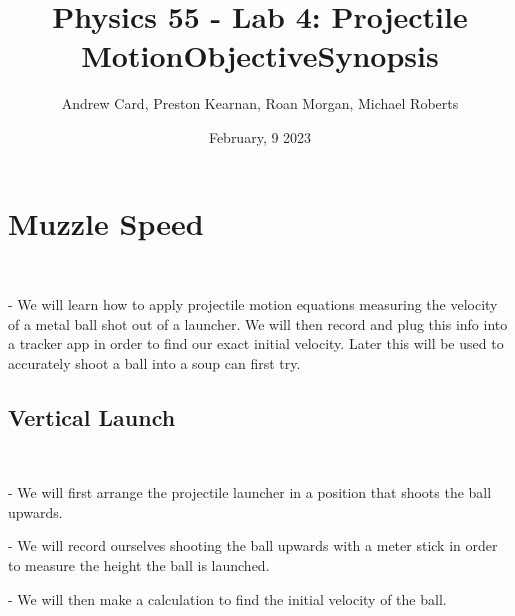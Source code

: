 \documentclass[letter paper, title page]{article}
\title{\huge Physics 55 - Lab 4: Projectile Motion}
\author{Andrew Card, Preston Kearnan, Roan Morgan, Michael Roberts}
\date{February, 9 2023}
\begin{document}
\maketitle

\section*{Muzzle Speed} %
\title{Objective} 
\begin{list}
    \\ \item - We will learn how to apply projectile motion equations measuring the velocity of a metal ball shot out of a launcher. We will then record and plug this info into a tracker app in order to find our exact initial velocity. Later this will be used to accurately shoot a ball into a soup can first try.
\end{list}

\subsection*{Vertical Launch}

\noindent
\title{Synopsis}

\begin{list}
     \\ \item - We will first arrange the projectile launcher in a position that shoots the ball upwards. 
      \item - We will record ourselves shooting the ball upwards with a meter stick in order to measure the height the ball is launched.
    
      \item- We will then make a calculation to find the initial velocity of the ball. 
\end{list}
\end{document}
